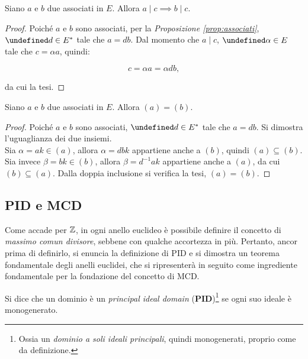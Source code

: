 \documentclass[a4paper]{article}
\let\oldexists\exists
\let\exists\undefined
\DeclareMathOperator{\exists}{\oldexists}
\begin{document}
\begin{proposition}
    \label{prop:divisione_associati}
    Siano $a$ e $b$ due associati in $E$. Allora $a \mid c \implies b \mid c$.
\end{proposition}

\begin{proof}
    Poiché $a$ e $b$ sono associati, per la \textit{Proposizione \ref{prop:associati}}, $\exists d \in E^*$ tale che
    $a = db$. Dal momento che $a \mid c$, $\exists \alpha \in E$ tale che
    $c = \alpha a$, quindi:

    \[ c = \alpha a = \alpha d b,\]

    da cui la tesi.
\end{proof}

\begin{proposition}
    \label{prop:associati_generatori}
    Siano $a$ e $b$ due associati in $E$. Allora
    $(a)=(b)$.
\end{proposition}

\begin{proof}
    Poiché $a$ e $b$ sono associati, $\exists d \in E^*$ tale che $a = db$. Si dimostra l'uguaglianza dei due insiemi. \\

    Sia $\alpha = ak \in (a)$, allora $\alpha = dbk$ appartiene anche a $(b)$, quindi $(a) \subseteq (b)$. Sia
    invece $\beta = bk \in (b)$, allora $\beta = d^{-1}ak$
    appartiene anche a $(a)$, da cui $(b) \subseteq (a)$.
    Dalla doppia inclusione si verifica la tesi, $(a)=(b)$.
\end{proof}

\subsection{PID e MCD}

Come accade per $\mathbb{Z}$, in ogni anello euclideo è possibile definire il
concetto di \textit{massimo comun divisore}, sebbene con qualche accortezza
in più. Pertanto, ancor prima di definirlo, si enuncia la definizione di
PID e si dimostra un teorema fondamentale degli anelli euclidei, che
si ripresenterà in seguito come ingrediente fondamentale per la fondazione
del concetto di MCD.

\begin{definition}
    Si dice che un dominio è un \textit{principal ideal domain} (\textbf{PID})\footnote{Ossia un \textit{dominio
            a soli ideali principali}, quindi monogenerati, proprio come da definizione.} se ogni suo ideale è monogenerato.
\end{definition}
\end{document}
